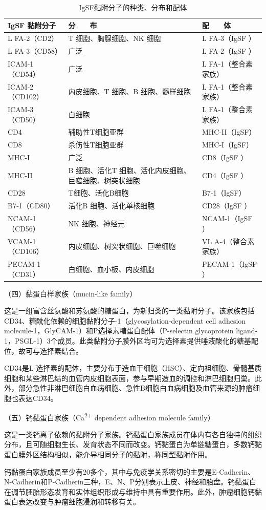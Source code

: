 \begin{longtable}[]{@{}lll@{}}
    \caption{IgSF黏附分子的种类、分布和配体}
    \label{tab8-1}\\
\toprule
IgSF 黏附分子 & 分　　布 & 配　　体\tabularnewline
\midrule
\endhead
L FA‐2（CD2） & T 细胞、胸腺细胞、NK 细胞 & L FA‐3（IgSF
）\tabularnewline
L FA‐3（CD58） & 广泛 & L FA‐2（IgSF ）\tabularnewline
ICAM‐1（CD54） & 广泛 & L FA‐1（整合素家族）\tabularnewline
ICAM‐2（CD102） & 内皮细胞、T 细胞、B 细胞、髓样细胞 & L
FA‐1（整合素家族）\tabularnewline
ICAM‐3（CD50） & 白细胞 & L FA‐1（整合素家族）\tabularnewline
CD4 & 辅助性T细胞亚群 & MHC‐II（IgSF）\tabularnewline
CD8 & 杀伤性T细胞亚群 & MHC‐I（IgSF）\tabularnewline
MHC‐I & 广泛 & CD8（IgSF ）\tabularnewline
MHC‐II & B 细胞、活化T 细胞、活化内皮细胞、巨噬细胞、树突状细胞 &
CD4（IgSF ）\tabularnewline
CD28 & T细胞、活化B细胞 & B7‐1（IgSF）\tabularnewline
B7‐1（CD80） & 活化B 细胞、活化单核细胞 & CD28（IgSF ）\tabularnewline
NCAM‐1（CD56） & NK 细胞、神经元 & NCAM‐1（IgSF ）\tabularnewline
VCAM‐1（CD106） & 内皮细胞、树突状细胞、巨噬细胞 & VL
A‐4（整合素家族）\tabularnewline
PECAM‐1（CD31） & 白细胞、血小板、内皮细胞 & PECAM‐1（IgSF
）\tabularnewline
\bottomrule
\end{longtable}

（四）黏蛋白样家族（mucin-like family）

这是一组富含丝氨酸和苏氨酸的糖蛋白，为新归类的一类黏附分子。该家族包括CD34、糖酰化依赖的细胞黏附分子-1（glycosylation-dependent
cell adhesion molecule-1，GlyCAM-1）和P选择素糖蛋白配体（P-selectin
glycoprotein
ligand-1，PSGL-1）3个成员。此类黏附分子膜外区均可为选择素提供唾液酸化的糖基配位，故可与选择素结合。

CD34是L-选择素的配体，主要分布于造血干细胞（HSC）、定向祖细胞、骨髓基质细胞和某些淋巴结的血管内皮细胞表面，参与早期造血的调控和淋巴细胞归巢。此外，部分急性非淋巴细胞白血病细胞、急性B细胞白血病细胞及血管来源的肿瘤细胞也表达CD34。

（五）钙黏蛋白家族（Ca\textsuperscript{2+} dependent adhesion molecule
family）

这是一类钙离子依赖的黏附分子家族。钙黏蛋白家族成员在体内有各自独特的组织分布，且可随细胞生长、发育状态不同而改变。钙黏蛋白为单链糖蛋白，多数钙黏蛋白膜外区结构相似，能介导相同分子的黏附，称同型黏附作用。

钙黏蛋白家族成员至少有20多个，其中与免疫学关系密切的主要是E-Cadherin、N-Cadherin和P-Cadherin三种，E、N、P分别表示上皮、神经和胎盘。钙黏蛋白在调节胚胎形态发育和实体组织形成与维持中具有重要作用。此外，肿瘤细胞钙黏蛋白表达改变与肿瘤细胞浸润和转移有关。

